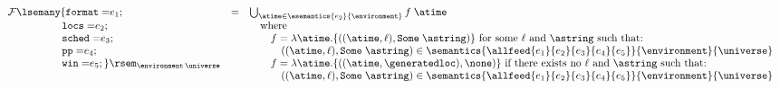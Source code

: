 \begin{figure*}[t]
\[\begin{array}{lcl}
\\
{\cal F}\lsem\mathtt{any \{ format=} e_1;
 &=& \bigcup_{\atime \in \esemantics{e_2}{\environment}} f\; \atime \\
 \qquad\qquad\ \ \ \,   \mathtt{locs=} e_2;
&&\quad\mbox{where} \\
 \qquad\qquad\ \ \ \,    \mathtt{sched=} e_3;
  && 
\qquad f = \lambda \atime. \{((\atime,\ell),\mathtt{Some} \; \astring)\}\ \mbox{for some $\ell$ and $\astring$ such that:}\\
 \qquad\qquad\ \ \ \,    \mathtt{pp=} e_4;
&&\qquad\quad
 \mbox{$((\atime,\ell),\mathtt{Some} \; \astring) \in \semantics{\allfeed{e_1}{e_2}{e_3}{e_4}{e_5}}{\environment}{\universe}$}
  \\
 \qquad\qquad\ \ \ \,   \mathtt{win=} e_5;
 \}\rsem_{{\environment} \, {\universe}}
&&\qquad
  f = \lambda \atime. \{((\atime,\generatedloc), \none)\}\  
  \mbox{%
if there exists no $\ell$ and $\astring$ such that:} \\
&&\qquad\quad 
 \mbox{$((\atime,\ell),\mathtt{Some} \; \astring) \in \semantics{\allfeed{e_1}{e_2}{e_3}{e_4}{e_5}}{\environment}{\universe}$}
\\


\end{array}\]
\end{figure*}
